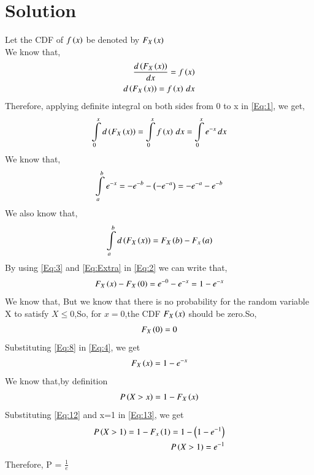 \documentclass[journal,12pt,twocolumn]{IEEEtran}
\begin{document}
\section{Solution}
Let the CDF of $f\left(x\right)$ be denoted by $F_X\left(x\right)$ \\
We know that,
\begin{align}
\frac{d\left(F_X\left(x\right)\right)}{dx} = f\left(x\right) \notag \\
d\left(F_X\left(x\right)\right) = f\left(x\right) \,dx \label{Eq:1}
\end{align}
Therefore, applying definite integral on both sides from 0 to x in \eqref{Eq:1}, we get,
\begin{align}
\int\limits_{0}^{x} d\left(F_X\left(x\right)\right) = \int\limits_{0}^{x} f\left(x\right) \,dx = \int\limits_{0}^{x} e^{-x} \,dx \label{Eq:2}
\end{align}
We know that,
\begin{align}
\int\limits_{a}^{b} e^{-x} = -e^{-b}-\left(-e^{-a}\right) = -e^{-a}-e^{-b}  \label{Eq:3}
\end{align}
We also know that,
\begin{align}
\int\limits_{a}^{b} d\left(F_X\left(x\right)\right) = F_X\left(b\right) - F_x\left(a\right) \label{Eq:Extra}
\end{align}
By using \eqref{Eq:3} and \eqref{Eq:Extra} in \eqref{Eq:2} we can write that,
\begin{align}
F_X\left(x\right) - F_X\left(0\right) = e^{-0} - e^{-x} = 1 - e^{-x}   \label{Eq:4}
\end{align}
We know that,
But we know that there is no probability for the random variable X to satisfy $X \leq 0$,So, for $x = 0$,the CDF $F_X\left(x\right)$ should be zero.So,
\begin{align}
F_X\left(0\right) = 0 \label{Eq:8}
\end{align}
Substituting \eqref{Eq:8} in \eqref{Eq:4}, we get
\begin{align}
F_X\left(x\right) = 1 - e^{-x} \label{Eq:12}
\end{align}
We know that,by definition 
\begin{align}
P\left(X > x\right) = 1-F_X\left(x\right) \label{Eq:13}
\end{align}
Substituting \eqref{Eq:12} and x=1 in \eqref{Eq:13}, we get
\begin{align}
P\left(X>1\right)=1-F_x\left(1\right)=1-\left(1-e^{-1}\right) \\
P\left(X>1\right)=e^{-1}
\end{align}
Therefore, P = $\frac{1}{e}$
\newpage
\end{document}
